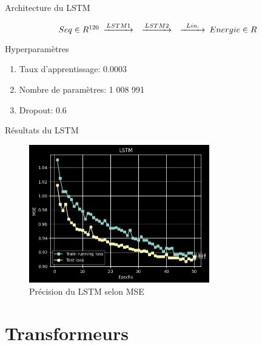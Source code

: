\documentclass{beamer}
\begin{document}
\begin{frame}{Architecture du LSTM}

\begin{equation*}
    \begin{CD}
        @. Seq \in R^{120}
        @>LSTM1>> 
        @>LSTM2>> 
        @>Lin.>> 
        Energie \in R
    \end{CD}
\end{equation*}

\begin{block}{Hyperparamètres}
\begin{enumerate}
    \item Taux d'apprentissage: 0.0003
    \item Nombre de paramètres: 1 008 991 
    \item Dropout: 0.6
\end{enumerate}
\end{block}

\end{frame}

\begin{frame}{Résultats du LSTM}

\begin{figure} \label{fig:lstm}
    \caption{Précision du LSTM selon MSE} \center
    \includegraphics[width=0.7\textwidth]{images/lstm.png}
\end{figure}

\end{frame}
\section{Transformeurs}
\end{document}

